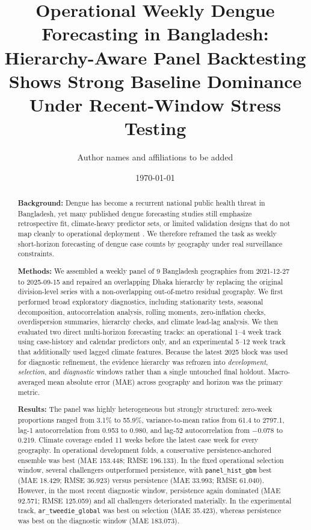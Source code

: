 \documentclass[11pt]{article}
\title{Operational Weekly Dengue Forecasting in Bangladesh: Hierarchy-Aware Panel Backtesting Shows Strong Baseline Dominance Under Recent-Window Stress Testing}
\author{Author names and affiliations to be added}
\date{\today}
\begin{document}
\maketitle

\begin{abstract}
\textbf{Background:} Dengue has become a recurrent national public health threat in Bangladesh, yet many published dengue forecasting studies still emphasize retrospective fit, climate-heavy predictor sets, or limited validation designs that do not map cleanly to operational deployment \citep{bhatt2013global,leung2023systematic,who2023bangladesh}. We therefore reframed the task as weekly short-horizon forecasting of dengue case counts by geography under real surveillance constraints.

\textbf{Methods:} We assembled a weekly panel of 9 Bangladesh geographies from 2021-12-27 to 2025-09-15 and repaired an overlapping Dhaka hierarchy by replacing the original division-level series with a non-overlapping out-of-metro residual geography. We first performed broad exploratory diagnostics, including stationarity tests, seasonal decomposition, autocorrelation analysis, rolling moments, zero-inflation checks, overdispersion summaries, hierarchy checks, and climate lead-lag analysis. We then evaluated two direct multi-horizon forecasting tracks: an operational 1--4 week track using case-history and calendar predictors only, and an experimental 5--12 week track that additionally used lagged climate features. Because the latest 2025 block was used for diagnostic refinement, the evidence hierarchy was refrozen into \emph{development}, \emph{selection}, and \emph{diagnostic} windows rather than a single untouched final holdout. Macro-averaged mean absolute error (MAE) across geography and horizon was the primary metric.

\textbf{Results:} The panel was highly heterogeneous but strongly structured: zero-week proportions ranged from 3.1\% to 55.9\%, variance-to-mean ratios from 61.4 to 2797.1, lag-1 autocorrelation from 0.953 to 0.980, and lag-52 autocorrelation from $-0.078$ to 0.219. Climate coverage ended 11 weeks before the latest case week for every geography. In operational development folds, a conservative persistence-anchored ensemble was best (MAE 153.448; RMSE 196.133). In the fixed operational selection window, several challengers outperformed persistence, with \texttt{panel\_hist\_gbm} best (MAE 18.429; RMSE 36.923) versus persistence (MAE 33.993; RMSE 61.040). However, in the most recent diagnostic window, persistence again dominated (MAE 92.571; RMSE 125.059) and all challengers deteriorated materially. In the experimental track, \texttt{ar\_tweedie\_global} was best on selection (MAE 35.423), whereas persistence was best on the diagnostic window (MAE 183.073).


\end{abstract}
\end{document}
